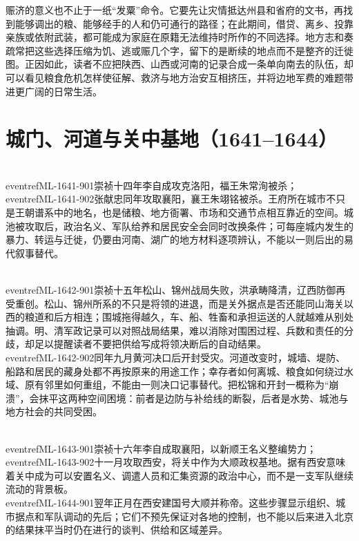 赈济的意义也不止于一纸“发粟”命令。它要先让灾情抵达州县和省府的文书，再找到能够调出的粮、能够经手的人和仍可通行的路径；在此期间，借贷、离乡、投靠亲族或依附武装，都可能成为家庭在原籍无法维持时所作的不同选择。地方志和奏疏常把这些选择压缩为饥、逃或赈几个字，留下的是断续的地点而不是整齐的迁徙图。正因如此，读者不应把陕西、山西或河南的记录合成一条单向南去的队伍，却可以看见粮食危机怎样使征解、救济与地方治安互相挤压，并将边地军费的难题带进更广阔的日常生活。

\section{城门、河道与关中基地（1641--1644）}

\\eventref{ML-1641-901}{崇祯十四年李自成攻克洛阳，福王朱常洵被杀}；\\eventref{ML-1641-902}{张献忠同年攻取襄阳，襄王朱翊铭被杀}。王府所在城市不只是王朝谱系中的地名，也是储粮、地方衙署、市场和交通节点相互靠近的空间。城池被攻取后，政治名义、军队给养和居民安全会同时改换条件；可每座城内发生的暴力、转运与迁徙，仍要由河南、湖广的地方材料逐项辨认，不能以一则后出的易代叙事替代。

\\eventref{ML-1642-901}{崇祯十五年松山、锦州战局失败，洪承畴降清}，辽西防御再受重创。松山、锦州所系的不只是将领的进退，而是关外据点是否还能同山海关以西的粮道和后方相连；围城拖得越久，车、船、牲畜和承担运送的人就越难从别处抽调。明、清军政记录可以对照战局结果，难以消除对围困过程、兵数和责任的分歧，却足以提醒读者不要把供给写成将领决断后的自动结果。\\eventref{ML-1642-902}{同年九月黄河决口后开封受灾}。河道改变时，城墙、堤防、船路和居民的藏身处都不再按原来的用途工作；幸存者如何离城、粮食如何绕过水域、原有邻里如何重组，不能由一则决口记事替代。把松锦和开封一概称为“崩溃”，会抹平这两种空间困境：前者是边防与补给线的断裂，后者是水势、城池与地方社会的共同受困。

\\eventref{ML-1643-901}{崇祯十六年李自成取襄阳，以新顺王名义整编势力}；\\eventref{ML-1643-902}{十一月攻取西安，将关中作为大顺政权基地}。据有西安意味着关中成为可以安置名义、调遣人员和汇集资源的政治中心，而不是一支军队继续流动的背景板。\\eventref{ML-1644-901}{翌年正月在西安建国号大顺并称帝}。这些步骤显示组织、城市据点和军队调动的先后；它们不预先保证对各地的控制，也不能以后来进入北京的结果抹平当时仍在进行的谈判、供给和区域差异。

